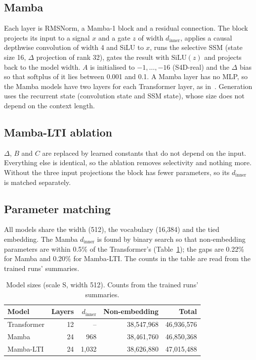 \documentclass[conference]{IEEEtran}
\begin{document}
\subsection{Mamba}
Each layer is RMSNorm, a Mamba-1 block and a residual connection. The block projects its input to a
signal $x$ and a gate $z$ of width $d_\text{inner}$, applies a causal depthwise convolution of width 4
and SiLU to $x$, runs the selective SSM (state size 16, $\Delta$ projection of rank 32), gates the
result with $\mathrm{SiLU}(z)$ and projects back to the model width. $A$ is initialised to
$-1,\dots,-16$ (S4D-real) and the $\Delta$ bias so that $\mathrm{softplus}$ of it lies between 0.001
and 0.1. A Mamba layer has no MLP, so the Mamba models have two layers for each Transformer layer, as
in~\cite{gu2023mamba}. Generation uses the recurrent state (convolution state and SSM state), whose
size does not depend on the context length.

\subsection{Mamba-LTI ablation}
$\Delta$, $B$ and $C$ are replaced by learned constants that do not depend on the input. Everything
else is identical, so the ablation removes selectivity and nothing more. Without the three input
projections the block has fewer parameters, so its $d_\text{inner}$ is matched separately.

\subsection{Parameter matching}
All models share the width (512), the vocabulary (16,384) and the tied embedding. The Mamba
$d_\text{inner}$ is found by binary search so that non-embedding parameters are within 0.5\% of the
Transformer's (Table~\ref{tab:params}); the gaps are 0.22\% for Mamba and 0.20\% for Mamba-LTI. The
counts in the table are read from the trained runs' summaries.

\begin{table}[t]
\centering
\caption{Model sizes (scale S, width 512). Counts from the trained runs' summaries.}
\label{tab:params}
\begin{tabular}{lrrrr}
\toprule
Model & Layers & $d_\text{inner}$ & Non-embedding & Total \\
\midrule
Transformer & 12 & -- & 38,547,968 & 46,936,576 \\
Mamba & 24 & 968 & 38,461,760 & 46,850,368 \\
Mamba-LTI & 24 & 1,032 & 38,626,880 & 47,015,488 \\
\bottomrule
\end{tabular}
\end{table}
\end{document}
